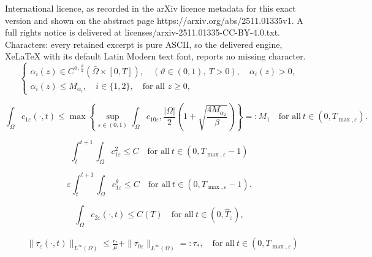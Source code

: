\documentclass[10pt,a4paper]{amsart}
\begin{document}
International licence, as recorded in the arXiv licence metadata for this exact version and shown on the abstract page https://arxiv.org/abs/2511.01335v1. A full rights notice is delivered at licenses/arxiv-2511.01335-CC-BY-4.0.txt. Characters: every retained excerpt is pure ASCII, so the delivered engine, XeLaTeX with its default Latin Modern text font, reports no missing character.
\begin{equation}
\label{alpha_def}
\begin{cases}
  \alpha_i(z) \in C^{\vartheta, \frac{\vartheta}{2}}(\bar{\Omega} \times [0, T]), \quad (\vartheta \in (0, 1), ~ T > 0), \quad \alpha_i(z) > 0, \\[1mm]
  \alpha_i(z) \leq M_{\alpha_i}, \quad i \in \{1, 2\}, \quad \text{for all } z \geq 0,
\end{cases}
\end{equation}

  \begin{equation}
    \label{l1c1}
    \int_\Omega c_{1\varepsilon}(\cdot, t) \leq \max\left\{\sup_{\varepsilon \in (0, 1)}\int_\Omega c_{10\varepsilon}, \frac{|\Omega|}{2} \left(1 + \sqrt{\frac{4 M_{\alpha_2}}{\beta}}\right)\right\} =: M_1 \quad \text{for all}~ t \in (0,T_{\max, \varepsilon}).
  \end{equation}

  \begin{equation}
  \label{c1_bound1}
    \int_t^{t + 1} \int_\Omega c_{1\varepsilon}^2 \leq C \quad \text{for all} ~ t \in (0, T_{\max, \varepsilon} - 1)
  \end{equation}

   \begin{equation}
   \label{c1_bound2}
    \varepsilon \int_t^{t + 1} \int_\Omega c_{1\varepsilon}^\theta \leq C  \quad \text{for all} ~ t \in (0, T_{\max, \varepsilon} - 1).
  \end{equation}

  \begin{equation}
    \label{l1c2}
    \int_\Omega c_{2\varepsilon}(\cdot, t) \leq C(T) \quad \text{for all}~ t \in (0, \widehat{T}_\varepsilon),
  \end{equation}

  \begin{align}
    \label{t_bound} & \|\tau_\varepsilon(\cdot, t)\|_{L^\infty(\Omega)} \leq \frac{r_\ast}{\mu} + \|\tau_{0 \varepsilon }\|_{L^\infty(\Omega)} =: \tau_\ast,\quad \text{for all}~ t \in (0, T_{\max, \varepsilon})
  \end{align}
\end{document}
